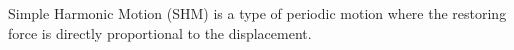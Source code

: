 \documentclass[preview]{standalone}
\begin{document}
\begin{center}
Simple Harmonic Motion (SHM) is a type of periodic motion where the restoring force is directly proportional to the displacement.
\end{center}
\end{document}
